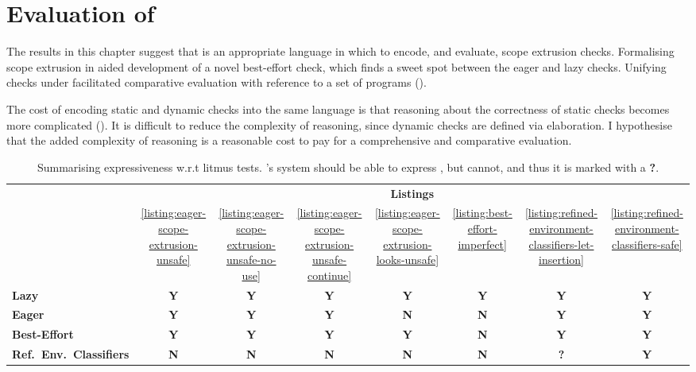 \section{Evaluation of \texorpdfstring{\sourceLang{}}{Lambda-Op-Quote-Splice}} \label{section:evaluation}
The results in this chapter suggest that \sourceLang{} is an appropriate language in which to encode, and evaluate, scope extrusion checks. Formalising scope extrusion in \sourceLang{} aided development of a novel best-effort check, which finds a sweet spot between the eager and lazy checks. Unifying checks under \sourceLang{} facilitated comparative evaluation with reference to a set of \sourceLang{} programs ().

The cost of encoding static and dynamic checks into the same language is that reasoning about the correctness of static checks becomes more complicated (). It is difficult to reduce the complexity of reasoning, since dynamic checks are defined via elaboration. I hypothesise that the added complexity of reasoning is a reasonable cost to pay for a comprehensive and comparative evaluation.



\newcommand{\yes}{\textbf{\textcolor{splice}{\sffamily Y}}}
\newcommand{\no}{\textbf{\textcolor{quote}{\sffamily N}}}
\newcommand{\maybe}{\textbf{\textcolor{compile}{\sffamily ?}}}


\begin{table}
  \newcommand\T{\rule{0pt}{2.6ex}}       %
\newcommand\B{\rule[-1.2ex]{0pt}{0pt}} 
  \centering
  \begin{tabular}{l|c|c|c|c|c|c|c}
    & \multicolumn{7}{c}{\textbf{Listings}}
    \\[2mm] &
    \ref{listing:eager-scope-extrusion-unsafe}&
    \ref{listing:eager-scope-extrusion-unsafe-no-use} &
    \ref{listing:eager-scope-extrusion-unsafe-continue} &
    \ref{listing:eager-scope-extrusion-looks-unsafe} &
    \ref{listing:best-effort-imperfect} & 
    \ref{listing:refined-environment-classifiers-let-insertion} & 
    \ref{listing:refined-environment-classifiers-safe} \T\B\\ \hline 
    \textbf{Lazy} & \yes & \yes & \yes & \yes & \yes & \yes & \yes \T\B\\ 
    \textbf{Eager} & \yes & \yes & \yes & \no & \no & \yes & \yes  \T\B\\
    \textbf{Best-Effort} & \yes & \yes & \yes & \yes & \no & \yes & \yes \T\B\\
    \textbf{Ref.\ Env.\ Classifiers}& \no & \no & \no & \no & \no & \maybe & \yes \T\B\\ \hline
  \end{tabular}
  \caption{Summarising expressiveness w.r.t litmus tests. \citeauthor{isoda-24}'s system should be able to express , but \recLang{} cannot, and thus it is marked with a \maybe.}
  \label{table:expressiveness-comparison}
\end{table}

